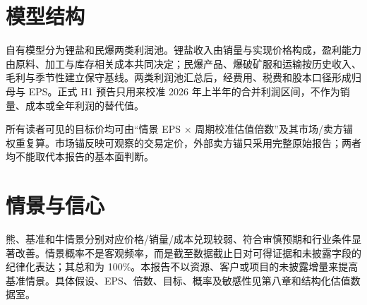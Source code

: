 \section{模型结构}

自有模型分为锂盐和民爆两类利润池。锂盐收入由销量与实现价格构成，盈利能力由原料、加工与库存相关成本共同决定；民爆产品、爆破矿服和运输按历史收入、毛利与季节性建立保守基线。两类利润池汇总后，经费用、税费和股本口径形成归母与 EPS。正式 H1 预告只用来校准 2026 年上半年的合并利润区间，不作为销量、成本或全年利润的替代值。

\begin{keyinsight}[复算纪律]
所有读者可见的目标价均可由“情景 EPS $\times$ 周期校准估值倍数”及其市场/卖方锚权重复算。市场锚反映可观察的交易定价，外部卖方锚只采用完整原始报告；两者均不能取代本报告的基本面判断。
\end{keyinsight}

\section{情景与信心}

熊、基准和牛情景分别对应价格/销量/成本兑现较弱、符合审慎预期和行业条件显著改善。情景概率不是客观频率，而是截至数据截止日对可得证据和未披露字段的纪律化表达；其总和为 100\%。本报告不以资源、客户或项目的未披露增量来提高基准情景。具体假设、EPS、倍数、目标、概率及敏感性见第八章和结构化估值数据室。
